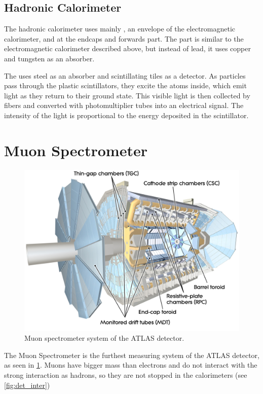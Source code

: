 \subsection{Hadronic Calorimeter}
The hadronic calorimeter uses mainly \TCal, an envelope of the electromagnetic calorimeter, and \LAr at the endcaps and forwards part.
The \LAr part is similar to the electromagnetic calorimeter described above, but instead of lead, it uses copper and tungsten as an absorber.

The \TCal uses steel as an absorber and scintillating tiles as a detector.
As particles pass through the plastic scintillators, they excite the atoms inside, which emit light as they return to their ground state.
This visible light is then collected by fibers and converted with photomultiplier tubes into an electrical signal.
The intensity of the light is proportional to the energy deposited in the scintillator.




\section{Muon Spectrometer}
\label{sec:muon}
\begin{figure}[htb]
    \centering
    \includegraphics[width=0.8\linewidth]{src/img/muon.jpg}
    \caption{Muon spectrometer system of the ATLAS detector.}
    \label{fig:muon}
\end{figure}

The Muon Spectrometer is the furthest measuring system of the ATLAS detector, as seen in \cref{fig:muon}.
Muons have bigger mass than electrons and do not interact with the strong interaction as hadrons, so they are not stopped in the calorimeters (see \cref{fig:det_inter})

